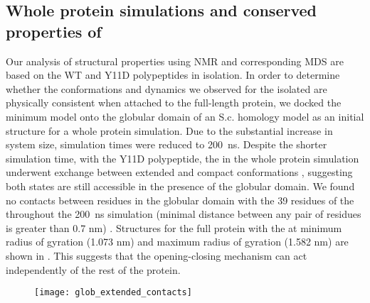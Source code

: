 

\subsection{Whole protein simulations and conserved properties of \gct}

Our analysis of \gct structural properties using NMR and corresponding MDS are based on the WT and Y11D \gct polypeptides in isolation. In order to determine whether the conformations and dynamics we observed for the isolated \gct are physically consistent when attached to the full-length \tub protein, we docked the minimum \diffusion \gct model  onto the globular domain of an S.c. \tub homology model as an initial structure for a whole protein simulation. Due to the substantial increase in system size, simulation times were reduced to \SI{200}{\ns}.  Despite the shorter simulation time, with the Y11D \gct polypeptide, the \gct in the whole protein simulation underwent exchange between extended and compact conformations , suggesting both states are still accessible in the presence of the globular domain. We found no contacts between residues in the globular domain with the 39 residues of the \gct throughout the \SI{200}{\ns} simulation (minimal distance between any pair of residues is greater than 0.7 nm) . Structures for the full protein with the \gct at minimum radius of gyration (1.073 nm) and maximum radius of gyration (1.582 nm) are shown in . This suggests that the \gct opening-closing mechanism can act independently of the rest of the protein.

\begin{figure}
\centering
\texttt{[image: glob\_extended\_contacts]}
\label{fig:glob_contacts}
\end{figure}


